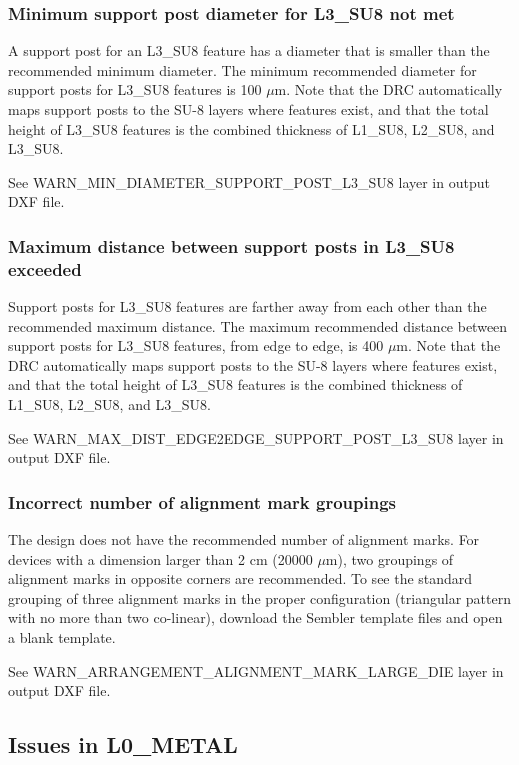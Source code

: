 \documentclass[twoside]{article}
\begin{document}
\subsubsection{Minimum support post diameter for L3\_SU8 not met}
\par A support post for an L3\_SU8 feature has a diameter that is smaller than
the recommended minimum diameter. The minimum recommended diameter for support
posts for L3\_SU8 features is 100 $\mu$m. Note that the DRC automatically maps
support posts to the SU-8 layers where features exist, and that the total height
of L3\_SU8 features is the combined thickness of L1\_SU8, L2\_SU8, and L3\_SU8.
\par See WARN\_MIN\_DIAMETER\_SUPPORT\_POST\_L3\_SU8 layer in output DXF file.

\subsubsection{Maximum distance between support posts in L3\_SU8 exceeded}
Support posts for L3\_SU8 features are farther away from each other than the
recommended maximum distance. The maximum recommended distance between support
posts for L3\_SU8 features, from edge to edge, is 400 $\mu$m. Note that the DRC
automatically maps support posts to the SU-8 layers where features exist, and
that the total height of L3\_SU8 features is the combined thickness of L1\_SU8,
L2\_SU8, and L3\_SU8.  \par See
WARN\_MAX\_DIST\_EDGE2EDGE\_SUPPORT\_POST\_L3\_SU8 layer in output DXF file.

\subsubsection{Incorrect number of alignment mark groupings}
\par The design does not have the recommended number of alignment marks. For
devices with a dimension larger than 2 cm (20000 $\mu$m), two groupings of
alignment marks in opposite corners are recommended. To see the standard
grouping of three alignment marks in the proper configuration (triangular
pattern with no more than two co-linear), download the Sembler template files
and open a blank template.  \par See
WARN\_ARRANGEMENT\_ALIGNMENT\_MARK\_LARGE\_DIE layer in output DXF file.

\subsection{Issues in L0\_METAL}
\end{document}
